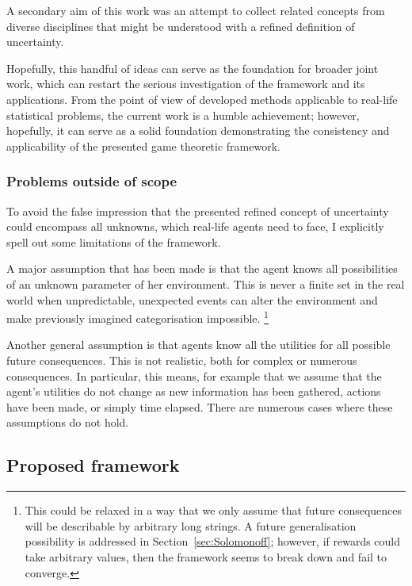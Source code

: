 \documentclass{article}
\theoremstyle{definition}
\begin{document}
A secondary aim of this work was an attempt to collect related concepts from diverse disciplines that might be understood with a refined definition of uncertainty.

Hopefully, this handful of ideas can serve as the foundation for broader joint work, which can restart the serious investigation of the framework and its applications.
From the point of view of developed methods applicable to real-life statistical problems, the current work is a humble achievement; however, hopefully, it can serve as a solid foundation demonstrating the consistency and applicability of the presented game theoretic framework.

\subsubsection{Problems outside of scope}

To avoid the false impression that the presented refined concept of uncertainty could encompass all unknowns, which real-life agents need to face, I explicitly spell out some limitations of the framework.

A major assumption that has been made is that the agent knows all possibilities of an unknown parameter of her environment. This is never a finite set in the real world when unpredictable, unexpected events can alter the environment and make previously imagined categorisation impossible.
\footnote{This could be relaxed in a way that we only assume that future consequences will be describable by arbitrary long strings. A future generalisation possibility is addressed in Section~\ref{sec:Solomonoff}; however, if rewards could take arbitrary values, then the framework seems to break down and fail to converge.}

Another general assumption is that agents know all the utilities for all possible future consequences. This is not realistic, both for complex or numerous consequences.
In particular, this means, for example that we assume that the agent's utilities do not change as new information has been gathered, actions have been made, or simply time elapsed.
There are numerous cases where these assumptions do not hold.

\subsection{Proposed framework}
\end{document}
